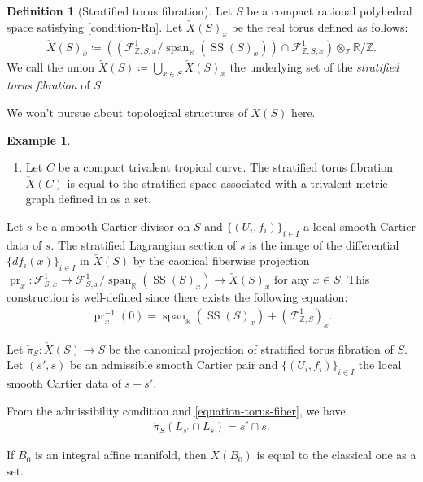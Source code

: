 \documentclass[a4paper,dvipdfmx,reqno,12pt]{amsart}
\theoremstyle{definition}
\newtheorem{definition}[theorem]{Definition}
\newtheorem{example}[theorem]{Example}
\newcommand{\deq}{\coloneqq}
\newcommand{\Z}{\mathbb{Z}}%
\newcommand{\opn}[1]{\operatorname{#1}}
\numberwithin{equation}{section}
\begin{document}
\begin{definition}[{Stratified torus fibration}]
Let $S$ be a compact rational polyhedral space 
satisfying \cref{condition-Rn}.
Let $\check{X}(S)_x$ be 
the real torus defined as follows:
\begin{align}
\check{X}(S)_x\deq  
((\mathcal{F}_{\mathbb{Z},S,x}^{1}/\opn{span}_{{\mathbb{R}}}
(\opn{SS}(S)_x))\cap \mathcal{F}_{\mathbb{Z},S,x}^{1})\otimes_{\Z} {\mathbb{R}}/\Z.
\end{align}
We call the union $\check{X}(S)\deq \bigcup_{x\in S}\check{X}(S)_x$
the underlying set of the \emph{stratified torus 
fibration} of $S$.

We won't pursue about
topological structures of $\check{X}(S)$ 
here.

\begin{example}

\begin{enumerate}
\item 
Let $C$ be a compact trivalent tropical curve.
The stratified torus fibration $\check{X}(C)$ is equal to 
the stratified space associated
with a trivalent metric graph defined in \cite{auroux2022lagrangian}
as a set.
\end{enumerate}

\end{example}

Let $s$ be a smooth 
Cartier divisor on $S$ and $\{(U_i,f_i)\}_{i\in I}$ a local
smooth Cartier data of $s$. 
The stratified Lagrangian section of $s$ is the image of the 
differential  $\{df_i(x)\}_{i\in I}$ in $\check{X}(S)$
by the caonical fiberwise projection 
$\opn{pr}_x\colon \mathcal{F}_{S,x}^{1}
\to \mathcal{F}_{S,x}^{1}/\opn{span}_{\mathbb{R}}(\opn{SS}(S)_x) \to \check{X}(S)_x$ for any $x\in S$.
This construction is well-defined since there exists 
the following equation: 
\begin{align}
\label{equation-torus-fiber}
\opn{pr}_x^{-1}(0)
=\opn{span}_{\mathbb{R}}(\opn{SS}(S)_x)+
(\mathcal{F}^{1}_{\mathbb{Z},S})_x.
\end{align}

Let $\check{\pi}_S\colon \check{X}(S)\to S$ be the 
canonical projection of stratified torus fibration of $S$.
Let $(s',s)$ be an admissible smooth Cartier pair and 
$\{(U_i,f_i)\}_{i\in I}$ the local smooth Cartier data of $s-s'$.

From the admissibility condition and
\cref{equation-torus-fiber}, we have
\begin{align}
\check{\pi}_S(L_{s'}\cap L_s)=s'\cap s.
\end{align}
\end{definition}
If $B_0$ is an integral affine manifold, then
$\check{X}(B_0)$ is equal to the classical one as a set. 
\end{document}
